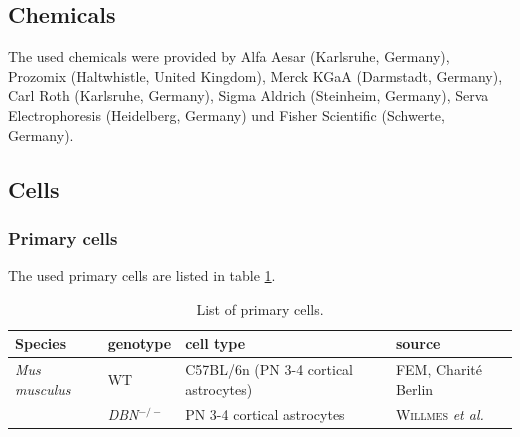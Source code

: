 \documentclass[a4paper,11pt,bibtotocnumbered]{article}
\begin{document}
\subsection{Chemicals}

The used chemicals were provided by Alfa Aesar (Karlsruhe, Germany), Prozomix (Haltwhistle, United Kingdom), Merck KGaA (Darmstadt, Germany), Carl Roth (Karlsruhe, Germany), Sigma Aldrich (Steinheim, Germany), Serva Electrophoresis (Heidelberg, Germany) und Fisher Scientific (Schwerte, Germany).


\subsection{Cells}





\subsubsection{Primary cells}

The used primary cells are listed in table \ref{PrimZellen}.

\begin{table}[H]
\centering
\caption{List of primary cells.}\label{PrimZellen}
\renewcommand{\arraystretch}{1}
\begin{tabularx}{\textwidth}{p{3cm}p{2cm}XX}
\toprule 
Species&genotype&cell type&source\\
\midrule
\midrule
\textit{Mus musculus}&WT &C57BL/6n (PN 3-4 cortical astrocytes)& FEM, Charité Berlin\\
&\textit{DBN}$^{-/-}$&PN 3-4 cortical astrocytes& \textsc{Willmes} \textit{et al.} \cite{Willmes2017}\\
\bottomrule
\end{tabularx}
\end{table}
\end{document}
